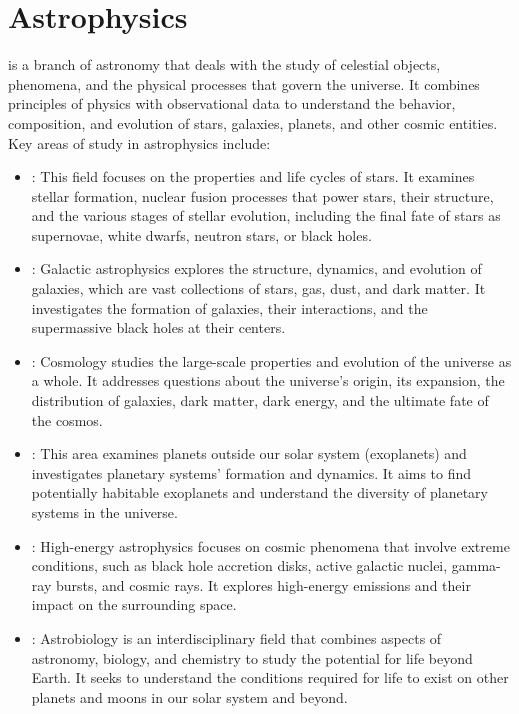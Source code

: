 \chapter{Astrophysics}
\thispagestyle{fancy}

 is a branch of astronomy that deals with the study of celestial objects, phenomena, and the physical processes that govern the universe. It combines principles of physics with observational data to understand the behavior, composition, and evolution of stars, galaxies, planets, and other cosmic entities. Key areas of study in astrophysics include:

\begin{itemize}
	\item {}: This field focuses on the properties and life cycles of stars. It examines stellar formation, nuclear fusion processes that power stars, their structure, and the various stages of stellar evolution, including the final fate of stars as supernovae, white dwarfs, neutron stars, or black holes.

	\item {}: Galactic astrophysics explores the structure, dynamics, and evolution of galaxies, which are vast collections of stars, gas, dust, and dark matter. It investigates the formation of galaxies, their interactions, and the supermassive black holes at their centers.

	\item {}: Cosmology studies the large-scale properties and evolution of the universe as a whole. It addresses questions about the universe's origin, its expansion, the distribution of galaxies, dark matter, dark energy, and the ultimate fate of the cosmos.

	\item {}: This area examines planets outside our solar system (exoplanets) and investigates planetary systems' formation and dynamics. It aims to find potentially habitable exoplanets and understand the diversity of planetary systems in the universe.

	\item {}: High-energy astrophysics focuses on cosmic phenomena that involve extreme conditions, such as black hole accretion disks, active galactic nuclei, gamma-ray bursts, and cosmic rays. It explores high-energy emissions and their impact on the surrounding space.

	\item {}: Astrobiology is an interdisciplinary field that combines aspects of astronomy, biology, and chemistry to study the potential for life beyond Earth. It seeks to understand the conditions required for life to exist on other planets and moons in our solar system and beyond.
\end{itemize}

